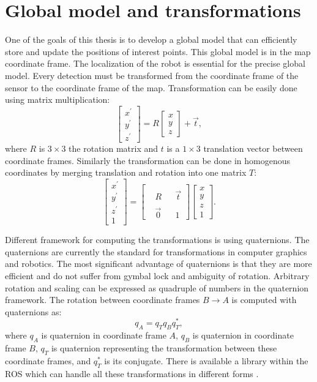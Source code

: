 \section{Global model and transformations}
One of the goals of this thesis is to develop a global model that can efficiently store and update the positions of interest points. This global model is in the map coordinate frame. The localization of the robot is essential for the precise global model. Every detection must be transformed from the coordinate frame of the sensor to the coordinate frame of the map. Transformation can be easily done using matrix multiplication:
\begin{equation}
\begin{bmatrix}
x^\prime \\
y^\prime \\
z^\prime 
\end{bmatrix}
=
R \begin{bmatrix}
x \\
y \\
z
\end{bmatrix}
+ \vec{t},
\end{equation}
where $R$ is $3\times3$ the rotation matrix and $t$ is a $1\times3$ translation vector between coordinate frames. Similarly the transformation can be done in homogenous coordinates by merging translation and rotation into one matrix $T$:
\begin{equation}
\begin{bmatrix}
x^\prime \\
y^\prime \\
z^\prime \\
1
\end{bmatrix}
=
\begin{bmatrix}
 & & & \\
 & R & & \vec{t} \\
 & & & \\
  & \vec{0} &  & 1
\end{bmatrix}
\begin{bmatrix}
x \\
y \\
z \\
1
\end{bmatrix}.
\end{equation}

Different framework for computing the transformations is using quaternions. The quaternions are currently the standard for transformations in computer graphics and robotics. The most significant advantage of quaternions is that they are more efficient and do not suffer from gymbal lock and ambiguity of rotation. Arbitrary rotation and scaling can be expressed as quadruple of numbers in the quaternion framework. The rotation between coordinate frames $B \to A$ is computed with quaternions as:
\begin{equation}
q_A = q_T q_B q_T^*,
\end{equation}
where $q_A$ is quaternion in coordinate frame $A$, $q_B$ is quaternion in coordinate frame $B$, $q_T$ is quaternion representing the transformation between these coordinate frames, and $q_T^*$ is its conjugate. There is available a library within the ROS which can handle all these transformations in different forms \cite{tf}. 

